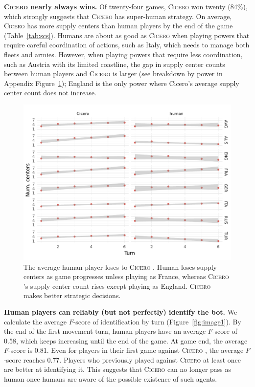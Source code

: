 \documentclass[oneside]{memoir}
\newcommand{\cicero}{\abr{Cicero} }
\newcommand{\abr}[1]{\textsc{#1}}
\begin{document}

\textbf{\cicero{} nearly always wins.}
%
Of twenty-four games, \cicero{} won twenty (84\%), which strongly suggests that \cicero{} has super-human strategy.
%
On average, \cicero{} has more supply centers than human players by the end of the game (Table~\ref{tab:scs}). 
%
Humans are about as good as \cicero{} when playing powers that require careful coordination of actions, such as Italy, which needs to manage both fleets and armies. 
%
However, when playing powers that require less coordination, such as Austria with its limited coastline, the gap in supply center counts between human players and \cicero{} is larger (see breakdown by power in Appendix Figure~\ref{fig:faceted_scs}); England is the only power where Cicero's average supply center count does not increase.
%
\begin{figure}
    \centering
    \includegraphics[width=\textwidth]{figures/faceted_scs.pdf}
    \caption{The average human player loses to \cicero{}. Human loses supply centers as game progresses unless playing as France, whereas \cicero{}'s supply center count rises except playing as England. \cicero{} makes better strategic decisions.}
    \label{fig:faceted_scs}
\end{figure}

\textbf{Human players can reliably (but not perfectly) identify the bot. }
%
We calculate the average $F$-score of identification by turn (Figure~\ref{fig:image1}). 
%
By the end of the first movement turn, human players have an average $F$-score of 0.58, which keeps increasing until the end of the game. 
%
At game end, the average $F$-score is 0.81. 
%
Even for players in their first game against \cicero{}, the average $F$-score reaches 0.77. 
%
Players who previously played against \cicero{} at least once are better at identifying it. 
%
This suggests that \cicero{} can no longer pass as human 
once humans are aware of the possible existence of such agents.
\end{document}
